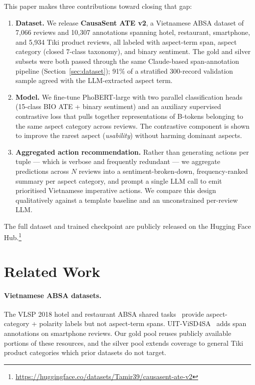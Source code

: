 \documentclass[conference]{IEEEtran}
\begin{document}
This paper makes three contributions toward closing that gap:

\begin{enumerate}
    \item \textbf{Dataset.} We release \textbf{CausaSent ATE v2}, a
    Vietnamese ABSA dataset of 7{,}066 reviews and 10{,}307 annotations
    spanning hotel, restaurant, smartphone, and 5{,}934 Tiki product
    reviews, all labeled with aspect-term span, aspect category (closed
    7-class taxonomy), and binary sentiment. The gold and silver subsets
    were both passed through the same Claude-based span-annotation
    pipeline (Section~\ref{sec:dataset}); 91\% of a stratified 300-record
    validation sample agreed with the LLM-extracted aspect term.

    \item \textbf{Model.} We fine-tune PhoBERT-large with two parallel
    classification heads (15-class BIO ATE + binary sentiment) and an
    auxiliary supervised contrastive loss that pulls together
    representations of B-tokens belonging to the same aspect category
    across reviews. The contrastive component is shown to improve the
    rarest aspect (\textit{usability}) without harming dominant aspects.

    \item \textbf{Aggregated action recommendation.} Rather than
    generating actions per tuple --- which is verbose and frequently
    redundant --- we aggregate predictions across $N$ reviews into a
    sentiment-broken-down, frequency-ranked summary per aspect category,
    and prompt a single LLM call to emit prioritised Vietnamese
    imperative actions. We compare this design qualitatively against a
    template baseline and an unconstrained per-review LLM.
\end{enumerate}

The full dataset and trained checkpoint are publicly released on the
Hugging Face Hub.\footnote{\url{https://huggingface.co/datasets/Tamir39/causasent-ate-v2}}

\section{Related Work}

\paragraph{Vietnamese ABSA datasets.} The VLSP 2018 hotel and restaurant
ABSA shared tasks~\cite{nguyen2018vlsp} provide aspect-category +
polarity labels but not aspect-term spans. UIT-ViSD4SA~\cite{luc2021uit}
adds span annotations on smartphone reviews. Our gold pool reuses
publicly available portions of these resources, and the silver pool
extends coverage to general Tiki product categories which prior datasets
do not target. %
\end{document}
